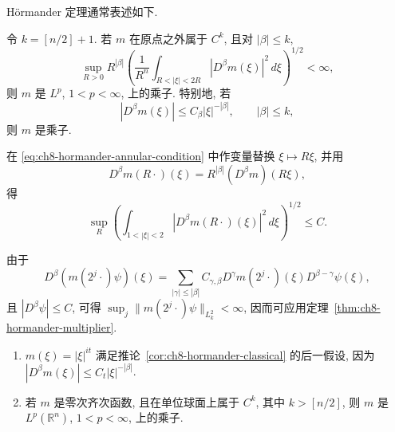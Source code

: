 Hörmander 定理通常表述如下.

\begin{Corollary}
\label{cor:ch8-hormander-classical}
令 $k=[n/2]+1$. 若 $m$ 在原点之外属于 $C^k$, 且对 $|\beta|\le k$,
\begin{equation}
\label{eq:ch8-hormander-annular-condition}
 \sup_{R>0}R^{|\beta|}
 \left(\frac1{R^n}\int_{R<|\xi|<2R}|D^\beta m(\xi)|^2\,d\xi\right)^{1/2}
 <\infty,
\end{equation}
则 $m$ 是 $L^p$, $1<p<\infty$, 上的乘子. 特别地, 若
\[
 |D^\beta m(\xi)|\le C_\beta|\xi|^{-|\beta|},
 \qquad|\beta|\le k,
\]
则 $m$ 是乘子.
\end{Corollary}

\begin{Proof}
在 \eqref{eq:ch8-hormander-annular-condition} 中作变量替换 $\xi\mapsto R\xi$, 并用
\[
 D^\beta m(R\cdot)(\xi)=R^{|\beta|}(D^\beta m)(R\xi),
\]
得
\[
 \sup_R\left(\int_{1<|\xi|<2}|D^\beta m(R\cdot)(\xi)|^2\,d\xi\right)^{1/2}
 \le C.
\]

\hypertarget{chapter-08-page-178}{}
由于
\[
 D^\beta(m(2^j\cdot)\psi)(\xi)
 =\sum_{|\gamma|\le|\beta|}C_{\gamma,\beta}
 D^\gamma m(2^j\cdot)(\xi)D^{\beta-\gamma}\psi(\xi),
\]
且 $|D^\beta\psi|\le C$, 可得 $\sup_j\|m(2^j\cdot)\psi\|_{L_k^2}<\infty$, 因而可应用定理~\ref{thm:ch8-hormander-multiplier}.
\end{Proof}

\begin{Example}
\label{ex:ch8-hormander-multiplier-examples}
\begin{enumerate}[label=(\arabic*)]
\item $m(\xi)=|\xi|^{it}$ 满足推论~\ref{cor:ch8-hormander-classical} 的后一假设, 因为 $|D^\beta m(\xi)|\le C_t|\xi|^{-|\beta|}$.
\item 若 $m$ 是零次齐次函数, 且在单位球面上属于 $C^k$, 其中 $k>[n/2]$, 则 $m$ 是 $L^p(\mathbb R^n)$, $1<p<\infty$, 上的乘子.
\end{enumerate}
\end{Example}
